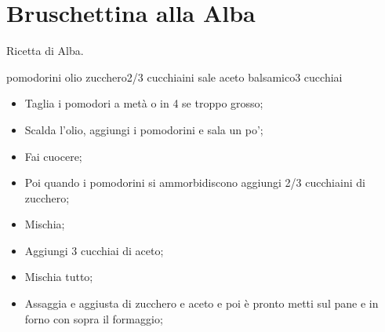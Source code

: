 \section{Bruschettina alla Alba}

Ricetta di Alba.
\generalRecipeInfos{}

\ingredienti%
    {pomodorini}{\qb{}}%
    {olio}{\qb{}}%
    {zucchero}{2/3 cucchiaini}%
    {sale}{\qb{}}%
    {aceto balsamico}{3 cucchiai}%


\begin{itemize}
    \item Taglia i pomodori a metà o in 4 se troppo grosso;
    \item Scalda l'olio, aggiungi i pomodorini e sala un po';
    \item Fai cuocere;
    \item Poi quando i pomodorini si ammorbidiscono aggiungi 2/3 cucchiaini di zucchero;
    \item Mischia;
    \item Aggiungi 3 cucchiai di aceto;
    \item Mischia tutto;
    \item Assaggia e aggiusta di zucchero e aceto e poi è pronto metti sul pane e in forno con sopra il formaggio;
\end{itemize}